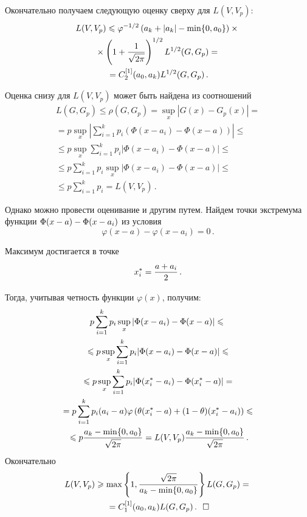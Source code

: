 \begin{multicols}{2}
Окончательно получаем следующую оценку сверху для
$L(V,V_p)$:
\begin{multline*}
L(V,V_p)\leqslant\varphi^{-1/2}\left(a_k+|a_k|-\min\{0,a_0\}\right)\times{}\\
{}\times
\left(1+\displaystyle\frac{\displaystyle 1\mathstrut}{\displaystyle \sqrt{2\pi}\mathstrut}\right)^{1/2}L^{1/2}(G,G_p)={}\\
{}=
C_2^{[1]}(a_0,a_k)L^{1/2}(G,G_p)\,.
\end{multline*}

Оценка снизу для $L(V,V_p)$ может быть найдена из соотношений
\begin{multline*}
L(G,G_p)\leqslant\rho(G,G_p)=\sup\limits_x|G(x)-G_p(x)|={}\\
{}=p\sup\limits_x\left|\sum\limits_{i=1}^k
p_i(\Phi(x-a_i)-\Phi(x-a))\right|
\leqslant{}\\
{}\leqslant
 p\sup\limits_x\sum\limits_{i=1}^k
p_i|\Phi(x-a_i)-\Phi(x-a)|\leqslant{}\\
{}\leqslant p\sum\limits_{i=1}^k
p_i\sup\limits_x|\Phi(x-a_i)-\Phi(x-a)|\leqslant{}\\
{}\leqslant
p\sum\limits_{i=1}^k p_i= L(V,V_p)\,.
\end{multline*}

Однако можно провести оценивание и другим путем. Найдем точки
экстремума функции $\Phi(x-a)\hm-\Phi(x-a_i)$ из условия
$$
\varphi(x-a)-\varphi(x-a_i)=0\,.
$$

Максимум достигается в точке
$$
x_i^*=\displaystyle\frac{\displaystyle a+a_i\mathstrut}{\displaystyle 2\mathstrut}\,.
$$

\pagebreak

\noindent
Тогда, учитывая четность функции $\varphi(x)$, получим:
\begin{multline*}
p\sum\limits_{i=1}^k
p_i\sup\limits_x|\Phi(x-a_i)-\Phi(x-a)|\leqslant{}\\
{}\leqslant
p\sup\limits_x\sum\limits_{i=1}^k
p_i|\Phi(x-a_i)-\Phi(x-a)|\leqslant{}\\
{}\leqslant p\sup\limits_x\sum\limits_{i=1}^k
p_i|\Phi(x_i^*-a_i)-\Phi(x_i^*-a)|
={}\\
{}= p\sum\limits_{i=1}^k
p_i(a_i-a)\varphi\left(\theta(x_i^*-a)+(1-\theta)(x_i^*-a_i)\right)\leqslant{}\\
{}\leqslant p\displaystyle\frac{\displaystyle a_k-\min\{0,a_0\}\mathstrut}{\displaystyle \sqrt{2\pi}\mathstrut}
=L(V,V_p)\displaystyle\frac{\displaystyle a_k-\min\{0,a_0\}\mathstrut}{\displaystyle \sqrt{2\pi}\mathstrut}\,.
\end{multline*}
%
Окончательно
\begin{multline*}
L(V,V_p)\geqslant\max\left\{1,\displaystyle\frac{\displaystyle \sqrt{2\pi}\mathstrut}{\displaystyle a_k-\min\{0,a_0\}\mathstrut}\right\}
L(G,G_p)={}\\
{}=C_1^{[1]}(a_0,a_k)L(G,G_p)\,.~~\square
\end{multline*}



\end{multicols}
